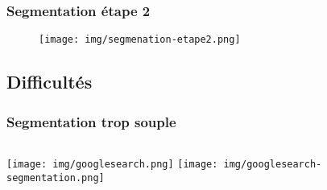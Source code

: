 \documentclass[]{beamer}
\begin{document}
\begin{frame}
\frametitle{Segmentation étape 2}
\begin{figure}
\centering
\texttt{[image: img/segmenation-etape2.png]}
\end{figure}
\end{frame}

\subsection{Difficultés}
\begin{frame}
\frametitle{Segmentation trop souple}
    \begin{columns}[c] %
     \texttt{[image: img/googlesearch.png]}
     \texttt{[image: img/googlesearch-segmentation.png]}
    \end{columns}
\end{frame}

\end{document}
